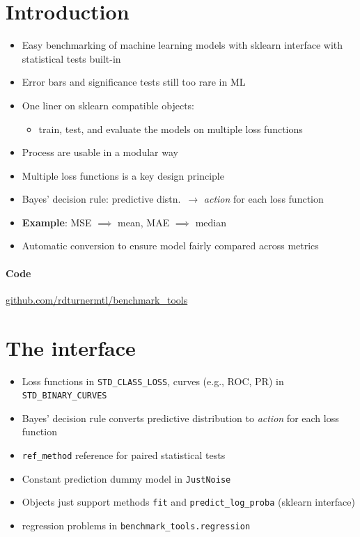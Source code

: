 \documentclass[a0,landscape]{a0poster}
\newcommand{\mysection}[1]{\section*{\fontsize{67.1}{82} \selectfont \color{NavyBlue} #1 \color{Black}}}
\newcommand{\code}{\texttt}
\begin{document}
\begin{multicols}{3} %


\Large

\mysection{Introduction}

\begin{itemize}
  \item Easy benchmarking of machine learning models with sklearn interface with statistical tests built-in
  \item Error bars and significance tests still too rare in ML
  \item One liner on sklearn compatible objects: 
  \begin{itemize}
    \item train, test, and evaluate the models on multiple loss functions
  \end{itemize}
  \item Process are usable in a modular way
\end{itemize}

\begin{itemize}
  \item Multiple loss functions is a key design principle
  \item Bayes' decision rule: predictive distn.~$\rightarrow$ \emph{action} for each loss function
  \item \textbf{Example}: MSE $\implies$ mean, MAE $\implies$ median
  \item Automatic conversion to ensure model fairly compared across metrics
\end{itemize}

\paragraph{Code}
\centering
\large {\url{github.com/rdturnermtl/benchmark_tools}}

\mysection{The interface}
%
\begin{itemize}
  \item Loss functions in \code{STD\_CLASS\_LOSS}, curves (e.g., ROC, PR) in \code{STD\_BINARY\_CURVES}
  \item Bayes' decision rule converts predictive distribution to \emph{action} for each loss function
  \item \code{ref\_method} reference for paired statistical tests
  \item Constant prediction dummy model in \code{JustNoise}
  \item Objects just support methods \code{fit} and \code{predict\_log\_proba} (sklearn interface)
  \item regression problems in \code{benchmark\_tools.regression}
\end{itemize}


\end{multicols}
\end{document}
